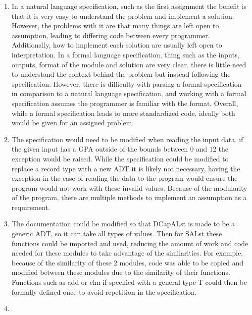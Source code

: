 \documentclass[12pt]{article}
\begin{document}
\begin{enumerate}

\item 

In a natural language specification, such as the first assignment the benefit is that it is very easy to understand the problem and implement a solution. However, the problems with it are that many things are left open to assumption, leading to differing code between every programmer. Additionally, how to implement each solution are usually left open to interpretation. In a formal language specification, thing such as the inputs, outputs, format of the module and solution are very clear, there is little need to understand the context behind the problem but instead following the specification. However, there is difficulty with parsing a formal specification in comparison to a natural language specification, and working with a formal specification assumes the programmer is familiar with the format. Overall, while a formal specification leads to more standardized code, ideally both would be given for an assigned problem.

\item

The specification would need to be modified when reading the input data, if the given input has a GPA outside of the bounds between 0 and 12 the exception would be raised. While the specification could be modified to replace a record type with a new ADT it is likely not necessary, having the exception in the case of reading the data to the program would ensure the program would not work with these invalid values. Because of the modularity of the program, there are multiple methods to implement an assumption as a requirement.

\newpage

\item

The documentation could be modified so that DCapALst is made to be a generic ADT, so it can take all types of values. Then for SALst these functions could be imported and used, reducing the amount of work and code needed for these modules to take advantage of the similarities.  For example, because of the similarity of these 2 modules, code was able to be copied and modified between these modules due to the similarity of their functions. Functions such as add or elm if specified with a general type T could then be formally defined once to avoid repetition in the specification. 

\item


\end{enumerate}
\end{document}
